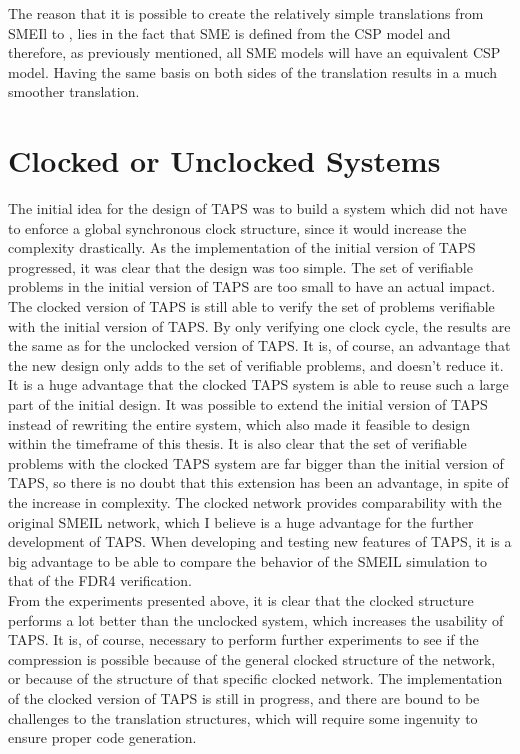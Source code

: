 The reason that it is possible to create the relatively simple translations from SMEIl to \cspm{}, lies in the fact that SME is defined from the CSP model and therefore, as previously mentioned, all SME models will have an equivalent CSP model. Having the same basis on both sides of the translation results in a much smoother translation.

\section{Clocked or Unclocked \cspm{} Systems}
The initial idea for the design of TAPS was to build a system which did not have to enforce a global synchronous clock structure, since it would increase the complexity drastically. As the implementation of the initial version of TAPS progressed, it was clear that the design was too simple. The set of verifiable problems in the initial version of TAPS are too small to have an actual impact.
The clocked version of TAPS is still able to verify the set of problems verifiable with the initial version of TAPS. By only verifying one clock cycle, the results are the same as for the unclocked version of TAPS.
It is, of course, an advantage that the new design only adds to the set of verifiable problems, and doesn't reduce it.\\

It is a huge advantage that the clocked TAPS system is able to reuse such a large part of the initial design. It was possible to extend the initial version of TAPS instead of rewriting the entire system, which also made it feasible to design within the timeframe of this thesis.
It is also clear that the set of verifiable problems with the clocked TAPS system are far bigger than the initial version of TAPS, so there is no doubt that this extension has been an advantage, in spite of the increase in complexity.
The clocked \cspm{} network provides comparability with the original SMEIL network, which I believe is a huge advantage for the further development of TAPS. When developing and testing new features of TAPS, it is a big advantage to be able to compare the behavior of the SMEIL simulation to that of the FDR4 verification. \\

From the experiments presented above, it is clear that the clocked structure performs a lot better than the unclocked system, which increases the usability of TAPS. It is, of course, necessary to perform further experiments to see if the compression is possible because of the general clocked structure of the network, or because of the structure of that specific clocked network.
The implementation of the clocked version of TAPS is still in progress, and there are bound to be challenges to the translation structures, which will require some ingenuity to ensure proper code generation.
